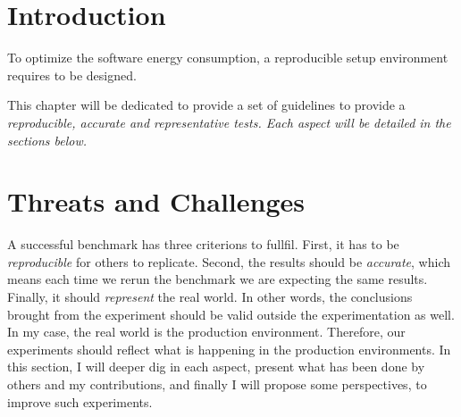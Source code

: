 
\section{Introduction}
To optimize the software energy consumption, a reproducible setup environment requires to be designed.

This chapter will be dedicated to provide a set of guidelines to provide a \em{reproducible, accurate} and \em{representative} tests. Each aspect will be detailed in the sections below.


\section{Threats and Challenges}

A successful benchmark has three criterions to fullfil.
First, it has to be \emph{reproducible} for others to replicate.
Second, the results should be \emph{accurate}, which means each time we rerun the benchmark we are expecting the same results.
Finally, it should \emph{represent} the real world.
In other words, the conclusions brought from the experiment should be valid outside the experimentation as well.
In my case, the real world is the production environment.
Therefore, our experiments should reflect what is happening in the production environments.
In this section, I will deeper dig in each aspect, present what has been done by others and my contributions, and finally I will propose some perspectives, to improve such experiments.




